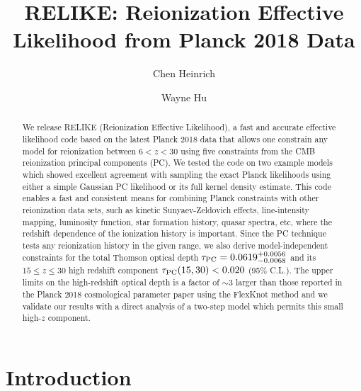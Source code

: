 \documentclass[prd,twocolumn,amsmath,amssymb,floatfix,superscriptaddress,nofootinbib]{revtex4-1}
\newcommand{\relike}{RELIKE}%
\begin{document}
	
\title{\relike: Reionization Effective Likelihood from Planck 2018 Data} 

\author{Chen Heinrich}

\author{Wayne Hu}

\begin{abstract}

We release RELIKE (Reionization Effective Likelihood), a fast and accurate effective likelihood code based on the latest Planck 2018 data 
that allows one constrain any model for reionization between $6 < z < 30$ using five constraints from the CMB reionization principal components (PC). We tested the code on two example models which showed excellent agreement with sampling the exact Planck likelihoods using either a simple Gaussian PC likelihood or its full kernel density estimate.
This code enables a fast and consistent means for 
combining Planck constraints with other reionization data sets, such as kinetic Sunyaev-Zeldovich effects, line-intensity mapping, luminosity function, star formation history, quasar spectra, etc, where the redshift dependence of the ionization history is important.  
Since the PC technique tests any reionization history in the given range, we also derive model-independent constraints for the total Thomson optical depth $\tau_{\rm PC} = 0.0619^{+0.0056}_{-0.0068}$ and its $15\le z \le 30$ high redshift component $\tau_{\rm PC}(15, 30) < 0.020 $ (95\% C.L.).
The upper limits on the high-redshift optical depth is a factor of $\sim3$ larger than those reported in the Planck 2018 cosmological parameter paper using the FlexKnot method
and we validate our results with a direct analysis of a two-step model which permits this small high-$z$ component.

\end{abstract}
\pacs{}

\maketitle

\section{Introduction}
\label{sec:intro}
\end{document}

